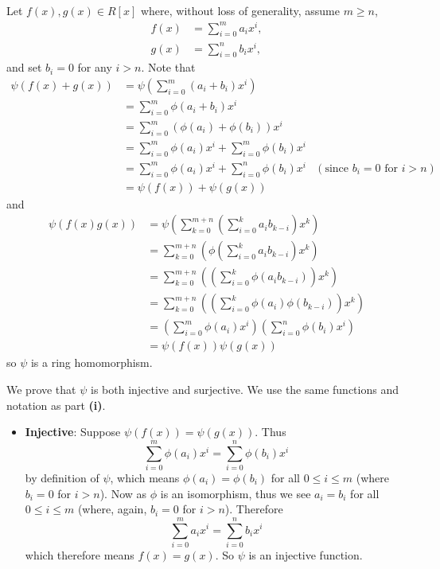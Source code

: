 \begin{questions}
    \item \begin{partquestions}{\roman*}
        \item Let $f(x), g(x) \in R[x]$ where, without loss of generality, assume $m \geq n$,
        \begin{align*}
            f(x) &= \sum_{i=0}^m a_ix^i,\\
            g(x) &= \sum_{i=0}^n b_ix^i,
        \end{align*}
        and set $b_i = 0$ for any $i > n$. Note that
        \begin{align*}
            \psi(f(x) + g(x)) &= \psi\left(\sum_{i=0}^m(a_i+b_i)x^i\right)\\
            &= \sum_{i=0}^m\phi(a_i + b_i)x^i\\
            &= \sum_{i=0}^m\left(\phi(a_i) + \phi(b_i)\right)x^i\\
            &= \sum_{i=0}^m\phi(a_i)x^i + \sum_{i=0}^m\phi(b_i)x^i\\
            &= \sum_{i=0}^m\phi(a_i)x^i + \sum_{i=0}^n\phi(b_i)x^i & (\text{since } b_i = 0 \text{ for } i > n)\\
            &= \psi(f(x)) + \psi(g(x))
        \end{align*}
        and
        \begin{align*}
            \psi(f(x)g(x)) &= \psi\left(\sum_{k=0}^{m+n}\left(\sum_{i=0}^ka_ib_{k-i}\right)x^k\right)\\
            &= \sum_{k=0}^{m+n}\left(\phi\left(\sum_{i=0}^ka_ib_{k-i}\right)x^k\right)\\
            &= \sum_{k=0}^{m+n}\left(\left(\sum_{i=0}^k\phi(a_ib_{k-i})\right)x^k\right)\\
            &= \sum_{k=0}^{m+n}\left(\left(\sum_{i=0}^k\phi(a_i)\phi(b_{k-i})\right)x^k\right)\\
            &= \left(\sum_{i=0}^m\phi(a_i)x^i\right)\left(\sum_{i=0}^n\phi(b_i)x^i\right)\\
            &= \psi(f(x))\psi(g(x))
        \end{align*}
        so $\psi$ is a ring homomorphism.

        \item We prove that $\psi$ is both injective and surjective. We use the same functions and notation as part \textbf{(i)}.
        \begin{itemize}
            \item \textbf{Injective}: Suppose $\psi(f(x)) = \psi(g(x))$. Thus
            \[
                \sum_{i=0}^m \phi(a_i)x^i = \sum_{i=0}^n \phi(b_i)x^i
            \]
            by definition of $\psi$, which means $\phi(a_i) = \phi(b_i)$ for all $0 \leq i \leq m$ (where $b_i = 0$ for $i > n$). Now as $\phi$ is an isomorphism, thus we see $a_i = b_i$ for all $0 \leq i \leq m$ (where, again, $b_i = 0$ for $i > n$). Therefore
            \[
                \sum_{i=0}^m a_ix^i = \sum_{i=0}^n b_ix^i
            \]
            which therefore means $f(x) = g(x)$. So $\psi$ is an injective function.


\end{itemize}
\end{partquestions}
\end{questions}
